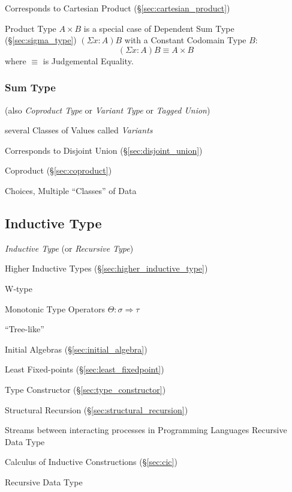 Corresponds to Cartesian Product (\S\ref{sec:cartesian_product})

Product Type $A \times B$ is a special case of Dependent Sum Type
(\S\ref{sec:sigma_type}) $(\Sigma x:A)B$ with a Constant Codomain
Type $B$:
\[
  (\Sigma x:A) B \equiv A \times B
\]
where $\equiv$ is Judgemental Equality.



\subsubsection{Sum Type}\label{sec:sum_type}

(also \emph{Coproduct Type} or \emph{Variant Type} or \emph{Tagged
  Union})

several Classes of Values called \emph{Variants}

Corresponds to Disjoint Union (\S\ref{sec:disjoint_union})

Coproduct (\S\ref{sec:coproduct})

Choices, Multiple ``Classes'' of Data



\subsection{Inductive Type}\label{sec:inductive_type}

\emph{Inductive Type} (or \emph{Recursive Type})

\fist Higher Inductive Types (\S\ref{sec:higher_inductive_type})

W-type

Monotonic Type Operators $\Theta : \sigma \Rightarrow \tau$

``Tree-like''

Initial Algebras (\S\ref{sec:initial_algebra})

Least Fixed-points (\S\ref{sec:least_fixedpoint})

Type Constructor (\S\ref{sec:type_constructor})

Structural Recursion (\S\ref{sec:structural_recursion})

Streams between interacting processes in Programming Languages
Recursive Data Type

Calculus of Inductive Constructions (\S\ref{sec:cic})


\asterism

Recursive Data Type

